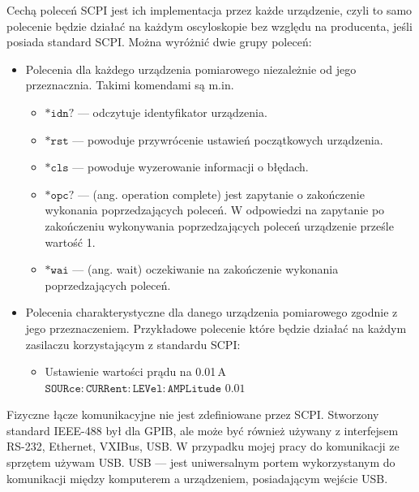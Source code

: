 Cechą poleceń SCPI jest ich implementacja przez każde urządzenie, czyli to samo polecenie będzie działać na każdym oscyloskopie
bez względu na producenta, jeśli posiada standard SCPI. Można wyróżnić dwie grupy poleceń:
\begin{itemize}
\item Polecenia dla każdego urządzenia pomiarowego niezależnie od jego przeznacznia. Takimi komendami są m.in.
\begin{itemize}
\item $\mathtt{*idn?}$ --- odczytuje identyfikator urządzenia.
\item $\mathtt{*rst}$ --- powoduje przywrócenie ustawień początkowych urządzenia.
\item $\mathtt{*cls}$ --- powoduje wyzerowanie informacji o błędach.
\item $\mathtt{*opc?}$ --- (ang. operation complete) jest zapytanie o zakończenie wykonania
poprzedzających poleceń.
W odpowiedzi na zapytanie po zakończeniu wykonywania poprzedzających poleceń urządzenie prześle wartość 1.
\item $\mathtt{*wai}$ --- (ang. wait) oczekiwanie na zakończenie wykonania poprzedzających poleceń.
\end{itemize}

\item Polecenia charakterystyczne dla danego urządzenia pomiarowego zgodnie z jego przeznaczeniem.
Przykładowe polecenie które będzie działać na każdym zasilaczu korzystającym z standardu SCPI:
\begin{itemize}
\item Ustawienie wartości prądu na 0.01\,A \\ $\mathtt{SOURce:CURRent:LEVel:AMPLitude}$ $\mathtt{0.01}$
\end{itemize}
\end{itemize}

Fizyczne łącze komunikacyjne nie jest zdefiniowane przez SCPI. Stworzony standard IEEE-488 był dla GPIB,
ale może być również używany z interfejsem RS-232, Ethernet, VXIBus, USB. W przypadku mojej pracy do komunikacji ze sprzętem
używam USB. USB --- jest uniwersalnym portem wykorzystanym do komunikacji między komputerem a urządzeniem, posiadającym wejście USB.
\newpage